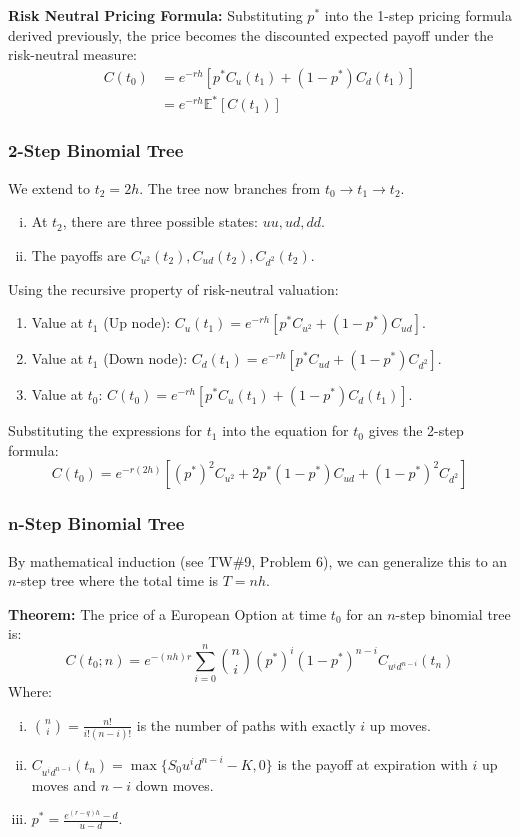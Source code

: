 \textbf{Risk Neutral Pricing Formula:}
Substituting $p^*$ into the 1-step pricing formula derived previously, the price becomes the discounted expected payoff under the risk-neutral measure:
\begin{align*}
    C(t_0) &= e^{-rh} [ p^* C_u(t_1) + (1-p^*) C_d(t_1) ] \\
    &= e^{-rh} \mathbb{E}^* [ C(t_1) ]
\end{align*}

\subsubsection{2-Step Binomial Tree}
We extend to $t_2 = 2h$. The tree now branches from $t_0 \to t_1 \to t_2$.
\begin{enumerate}[i.]
    \item At $t_2$, there are three possible states: $uu, ud, dd$.
    \item The payoffs are $C_{u^2}(t_2), C_{ud}(t_2),C_{d^2}(t_2)$.
\end{enumerate}

Using the recursive property of risk-neutral valuation:
\begin{enumerate}
    \item Value at $t_1$ (Up node): $C_u(t_1) = e^{-rh} [ p^* C_{u^2} + (1-p^*) C_{ud} ]$.
    \item Value at $t_1$ (Down node): $C_d(t_1) = e^{-rh} [ p^* C_{ud} + (1-p^*) C_{d^2} ]$.
    \item Value at $t_0$: $C(t_0) = e^{-rh} [ p^* C_u(t_1) + (1-p^*) C_d(t_1) ]$.
\end{enumerate}

Substituting the expressions for $t_1$ into the equation for $t_0$ gives the 2-step formula:
\begin{equation*}
    C(t_0) = e^{-r(2h)} \left[ (p^*)^2 C_{u^2} + 2p^*(1-p^*) C_{ud} + (1-p^*)^2 C_{d^2} \right]
\end{equation*}

\subsubsection{n-Step Binomial Tree}
By mathematical induction (see TW\#9, Problem 6), we can generalize this to an $n$-step tree where the total time is $T = nh$.

\textbf{Theorem: } The price of a European Option at time $t_0$ for an $n$-step binomial tree is:
\begin{equation*}
    \boxed{C(t_0; n) = e^{-(nh)r} \sum_{i=0}^{n} \binom{n}{i} (p^*)^i (1-p^*)^{n-i} C_{u^i d^{n-i}}(t_n)}
\end{equation*}
Where:
\begin{enumerate}[i.]
    \item $\binom{n}{i} = \frac{n!}{i!(n-i)!}$ is the number of paths with exactly $i$ up moves.
    \item $C_{u^i d^{n-i}}(t_n) = \max \{ S_0 u^i d^{n-i} - K, 0 \}$ is the payoff at expiration with $i$ up moves and $n-i$ down moves.
    \item $p^* = \frac{e^{(r-q)h} - d}{u-d}$.
\end{enumerate}

